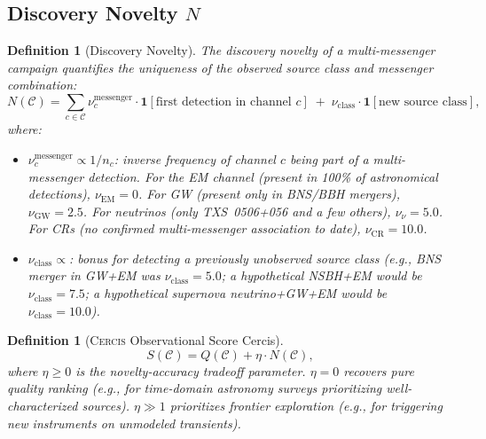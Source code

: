 \documentclass[11pt,a4paper]{article}
\newtheorem{definition}[theorem]{Definition}
\theoremstyle{definition}
\newcommand{\Cercis}{\textsc{Cercis}}
\newcommand{\ind}[1]{\mathbf{1}[#1]}
\begin{document}
\subsection{Discovery Novelty $N$}
\begin{definition}[Discovery Novelty]\label{def:N_astro}
The discovery novelty of a multi-messenger campaign quantifies the uniqueness of the observed source class and messenger combination:
\begin{equation}\label{eq:N_astro}
N(\mathcal{C}) = \sum_{c \in \mathcal{C}} \nu_c^{\mathrm{messenger}} \cdot \ind{\text{first detection in channel } c} \;+\; \nu_{\mathrm{class}} \cdot \ind{\text{new source class}},
\end{equation}
where:
\begin{itemize}
    \item $\nu_c^{\mathrm{messenger}} \propto 1/n_c$: inverse frequency of channel $c$ being part of a multi-messenger detection. For the EM channel (present in 100\% of astronomical detections), $\nu_{\mathrm{EM}} = 0$. For GW (present only in BNS/BBH mergers), $\nu_{\mathrm{GW}} = 2.5$. For neutrinos (only TXS~0506+056 and a few others), $\nu_{\nu} = 5.0$. For CRs (no confirmed multi-messenger association to date), $\nu_{\mathrm{CR}} = 10.0$.
    \item $\nu_{\mathrm{class}} \propto$: bonus for detecting a previously unobserved source class (e.g., BNS merger in GW+EM was $\nu_{\mathrm{class}} = 5.0$; a hypothetical NSBH+EM would be $\nu_{\mathrm{class}} = 7.5$; a hypothetical supernova neutrino+GW+EM would be $\nu_{\mathrm{class}} = 10.0$).
\end{itemize}
\end{definition}
\begin{definition}[\Cercis{} Observational Score Cercis]\label{def:cercis_astro}
\begin{equation}\label{eq:S_astro}
S(\mathcal{C}) = Q(\mathcal{C}) + \eta \cdot N(\mathcal{C}),
\end{equation}
where $\eta \geq 0$ is the novelty-accuracy tradeoff parameter. $\eta = 0$ recovers pure quality ranking (e.g., for time-domain astronomy surveys prioritizing well-characterized sources). $\eta \gg 1$ prioritizes frontier exploration (e.g., for triggering new instruments on unmodeled transients).
\end{definition}
\end{document}
